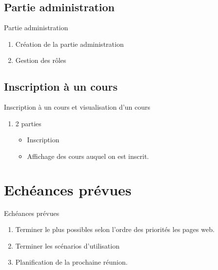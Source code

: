 \documentclass[numbering=fraction]{beamer}
\begin{document}
\subsection{Partie administration}
\begin{frame}{Partie administration}
    \begin{enumerate}
        \item Création de la partie administration
        \item Gestion des rôles
    \end{enumerate}
\end{frame}
\subsection{Inscription à un cours}
\begin{frame}{Inscription à un cours et visualisation d'un cours}
    \begin{enumerate}
        \item 2 parties
        \begin{itemize}
            \item Inscription
            \item Affichage des cours auquel on est inscrit.
        \end{itemize}
    \end{enumerate}
\end{frame}
\section{Echéances prévues}
\begin{frame}{Echéances prévues}
    \begin{enumerate}
        \item Terminer le plus possibles selon l'ordre des priorités les pages web.
        \item Terminer les scénarios d'utilisation
        \item Planification de la prochaine réunion.
    \end{enumerate}
\end{frame}
\end{document}
